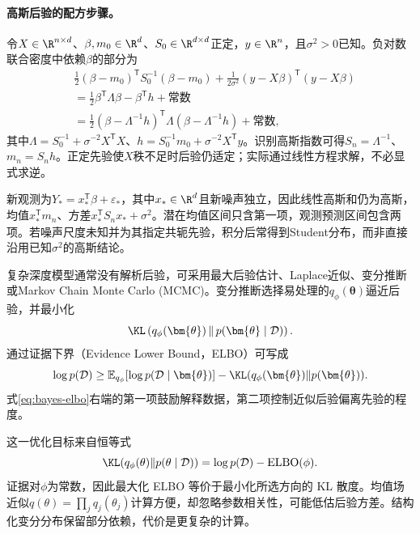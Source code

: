 \paragraph{高斯后验的配方步骤。}
令$X\in\R^{n\times d}$、$\beta,m_0\in\R^d$、$S_0\in\R^{d\times d}$正定，$y\in\R^n$，且$\sigma^2>0$已知。负对数联合密度中依赖$\beta$的部分为
\begin{align}
 &\frac12(\beta-m_0)^{\mathsf T}S_0^{-1}(\beta-m_0)
   +\frac1{2\sigma^2}(y-X\beta)^{\mathsf T}(y-X\beta)\\
 &=\frac12\beta^{\mathsf T}\Lambda\beta-\beta^{\mathsf T}h+\text{常数}\\
 &=\frac12(\beta-\Lambda^{-1}h)^{\mathsf T}\Lambda
   (\beta-\Lambda^{-1}h)+\text{常数},
\end{align}
其中$\Lambda=S_0^{-1}+\sigma^{-2}X^{\mathsf T}X$、$h=S_0^{-1}m_0+\sigma^{-2}X^{\mathsf T}y$。识别高斯指数可得$S_n=\Lambda^{-1}$、$m_n=S_nh$。正定先验使$X$秩不足时后验仍适定；实际通过线性方程求解，不必显式求逆。

新观测为$Y_*=x_*^{\mathsf T}\beta+\varepsilon_*$，其中$x_*\in\R^d$且新噪声独立，因此线性高斯和仍为高斯，均值$x_*^{\mathsf T}m_n$、方差$x_*^{\mathsf T}S_nx_*+\sigma^2$。潜在均值区间只含第一项，观测预测区间包含两项。若噪声尺度未知并为其指定共轭先验，积分后常得到Student分布，而非直接沿用已知$\sigma^2$的高斯结论。

复杂深度模型通常没有解析后验，可采用最大后验估计、Laplace近似、变分推断或Markov Chain Monte Carlo (MCMC)。变分推断选择易处理的$q_{\phi}(\bm{\theta})$逼近后验，并最小化
\begin{equation}
 \KL\left(q_{\phi}(\bm{\theta})\,\|\,p(\bm{\theta}\mid\mathcal{D})\right).
\end{equation}
通过证据下界（Evidence Lower Bound，ELBO）可写成
\begin{equation}
 \log p(\mathcal{D})\geq \mathbb{E}_{q_{\phi}}[\log p(\mathcal{D}\mid\bm{\theta})]-\KL(q_{\phi}(\bm{\theta})\|p(\bm{\theta})).\label{eq:bayes-elbo}
\end{equation}
式\eqref{eq:bayes-elbo}右端的第一项鼓励解释数据，第二项控制近似后验偏离先验的程度。

这一优化目标来自恒等式
\begin{equation}
 \KL(q_\phi(\theta)\|p(\theta\mid\mathcal D))
 =\log p(\mathcal D)-\operatorname{ELBO}(\phi).
\end{equation}
证据对$\phi$为常数，因此最大化 ELBO 等价于最小化所选方向的 KL 散度。均值场近似$q(\theta)=\prod_jq_j(\theta_j)$计算方便，却忽略参数相关性，可能低估后验方差。结构化变分分布保留部分依赖，代价是更复杂的计算。

